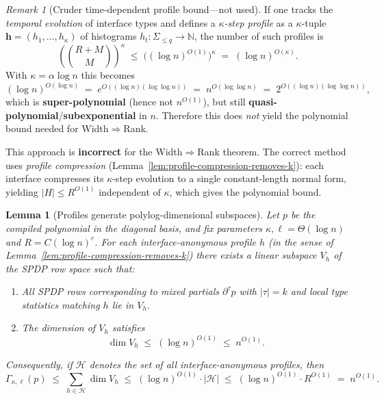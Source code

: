 \documentclass[12pt]{article}
\newtheorem{lemma}[theorem]{Lemma}
\theoremstyle{definition}
\theoremstyle{definition}
\theoremstyle{remark}
\newtheorem{remark}{Remark}
\theoremstyle{remark}
\begin{document}
\begin{remark}[Cruder time-dependent profile bound---not used]
\label{rem:profile-count-deprecated}
If one tracks the \emph{temporal evolution} of interface types and defines a
\emph{$\kappa$-step profile} as a $\kappa$-tuple $\mathbf{h}=(h_1,\dots,h_\kappa)$ of
histograms $h_t:\Sigma_{\le q}\to\mathbb{N}$, the number of such profiles is
\[
  \left( \binom{R+M}{M} \right)^\kappa
  \;\le\; \bigl((\log n)^{O(1)}\bigr)^\kappa
  \;=\; (\log n)^{O(\kappa)}.
\]
With $\kappa=\alpha\log n$ this becomes
\[
(\log n)^{O(\log n)} \;=\; e^{O((\log n)(\log\log n))}
\;=\; n^{O(\log\log n)} \;=\; 2^{O((\log n)(\log\log n))},
\]
which is \textbf{super-polynomial} (hence not $n^{O(1)}$), but still
\textbf{quasi-polynomial}/\textbf{subexponential} in $n$. Therefore this does
\emph{not} yield the polynomial bound needed for Width$\Rightarrow$Rank.

This approach is \textbf{incorrect} for the Width$\Rightarrow$Rank theorem.
The correct method uses \emph{profile compression}
(Lemma~\ref{lem:profile-compression-removes-k}): each interface compresses its
$\kappa$-step evolution to a single constant-length normal form, yielding
$|H| \le R^{O(1)}$ independent of $\kappa$, which gives the polynomial bound.
\end{remark}

\begin{lemma}[Profiles generate polylog-dimensional subspaces]
\label{lem:profile-subspace}
Let $p$ be the compiled polynomial in the diagonal basis, and fix parameters
$\kappa,\ell = \Theta(\log n)$ and $R = C (\log n)^c$. For each interface-anonymous
profile $h$ (in the sense of
Lemma~\ref{lem:profile-compression-removes-k}) there exists a linear subspace
$V_{h}$ of the SPDP row space such that:
\begin{enumerate}
  \item All SPDP rows corresponding to mixed partials $\partial^{\tau} p$ with
  $|\tau| = k$ and local type statistics matching $h$ lie in
  $V_{h}$.
  \item The dimension of $V_{h}$ satisfies
  \[
    \dim V_{h} \;\le\; (\log n)^{O(1)} \;\le\; n^{O(1)}.
  \]
\end{enumerate}
Consequently, if $\mathcal{H}$ denotes the set of all interface-anonymous
profiles, then
\[
  \Gamma_{\kappa,\ell}(p) \;\le\; \sum_{h \in \mathcal{H}} \dim V_{h}
  \;\le\; (\log n)^{O(1)} \cdot |\mathcal{H}|
  \;\le\; (\log n)^{O(1)} \cdot R^{O(1)}
  \;=\; n^{O(1)}.
\]
\end{lemma}
\end{document}
